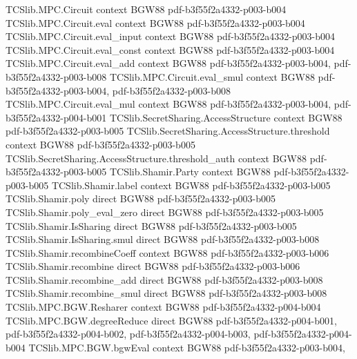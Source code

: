 \begin{theorem}
\label{TCSlib.MPC.BGW.bgwEval_mul}
\leanok
\proofstep
  {TCSlib.MPC.Circuit}
  {context}
  {BGW88}
  {pdf-b3f55f2a4332-p003-b004}
\proofstep
  {TCSlib.MPC.Circuit.eval}
  {context}
  {BGW88}
  {pdf-b3f55f2a4332-p003-b004}
\proofstep
  {TCSlib.MPC.Circuit.eval_input}
  {context}
  {BGW88}
  {pdf-b3f55f2a4332-p003-b004}
\proofstep
  {TCSlib.MPC.Circuit.eval_const}
  {context}
  {BGW88}
  {pdf-b3f55f2a4332-p003-b004}
\proofstep
  {TCSlib.MPC.Circuit.eval_add}
  {context}
  {BGW88}
  {pdf-b3f55f2a4332-p003-b004,
    pdf-b3f55f2a4332-p003-b008}
\proofstep
  {TCSlib.MPC.Circuit.eval_smul}
  {context}
  {BGW88}
  {pdf-b3f55f2a4332-p003-b004,
    pdf-b3f55f2a4332-p003-b008}
\proofstep
  {TCSlib.MPC.Circuit.eval_mul}
  {context}
  {BGW88}
  {pdf-b3f55f2a4332-p003-b004,
    pdf-b3f55f2a4332-p004-b001}
\proofstep
  {TCSlib.SecretSharing.AccessStructure}
  {context}
  {BGW88}
  {pdf-b3f55f2a4332-p003-b005}
\proofstep
  {TCSlib.SecretSharing.AccessStructure.threshold}
  {context}
  {BGW88}
  {pdf-b3f55f2a4332-p003-b005}
\proofstep
  {TCSlib.SecretSharing.AccessStructure.threshold_auth}
  {context}
  {BGW88}
  {pdf-b3f55f2a4332-p003-b005}
\proofstep
  {TCSlib.Shamir.Party}
  {context}
  {BGW88}
  {pdf-b3f55f2a4332-p003-b005}
\proofstep
  {TCSlib.Shamir.label}
  {context}
  {BGW88}
  {pdf-b3f55f2a4332-p003-b005}
\proofstep
  {TCSlib.Shamir.poly}
  {direct}
  {BGW88}
  {pdf-b3f55f2a4332-p003-b005}
\proofstep
  {TCSlib.Shamir.poly_eval_zero}
  {direct}
  {BGW88}
  {pdf-b3f55f2a4332-p003-b005}
\proofstep
  {TCSlib.Shamir.IsSharing}
  {direct}
  {BGW88}
  {pdf-b3f55f2a4332-p003-b005}
\proofstep
  {TCSlib.Shamir.IsSharing.smul}
  {direct}
  {BGW88}
  {pdf-b3f55f2a4332-p003-b008}
\proofstep
  {TCSlib.Shamir.recombineCoeff}
  {context}
  {BGW88}
  {pdf-b3f55f2a4332-p003-b006}
\proofstep
  {TCSlib.Shamir.recombine}
  {direct}
  {BGW88}
  {pdf-b3f55f2a4332-p003-b006}
\proofstep
  {TCSlib.Shamir.recombine_add}
  {direct}
  {BGW88}
  {pdf-b3f55f2a4332-p003-b008}
\proofstep
  {TCSlib.Shamir.recombine_smul}
  {direct}
  {BGW88}
  {pdf-b3f55f2a4332-p003-b008}
\proofstep
  {TCSlib.MPC.BGW.Resharer}
  {context}
  {BGW88}
  {pdf-b3f55f2a4332-p004-b004}
\proofstep
  {TCSlib.MPC.BGW.degreeReduce}
  {direct}
  {BGW88}
  {pdf-b3f55f2a4332-p004-b001,
    pdf-b3f55f2a4332-p004-b002,
    pdf-b3f55f2a4332-p004-b003,
    pdf-b3f55f2a4332-p004-b004}
\proofstep
  {TCSlib.MPC.BGW.bgwEval}
  {context}
  {BGW88}
  {pdf-b3f55f2a4332-p003-b004,
}
\end{theorem}
